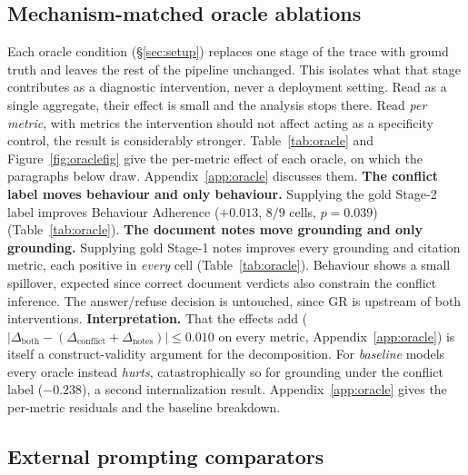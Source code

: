 \subsection{Mechanism-matched oracle ablations}
\label{sec:oracle}

Each oracle condition (\S\ref{sec:setup}) replaces one stage of the trace with ground truth
and leaves the rest of the pipeline unchanged. This isolates what that stage
contributes as a diagnostic intervention, never a deployment setting. Read as a single aggregate, their effect is small and the analysis stops there.
Read \emph{per metric}, with metrics the intervention should not affect acting
as a specificity control, the result is considerably stronger. Table~\ref{tab:oracle} and
Figure~\ref{fig:oraclefig} give the per-metric effect of each oracle, on which
the paragraphs below draw. Appendix~\ref{app:oracle} discusses them. \textbf{The conflict label moves behaviour and only behaviour.} Supplying the
gold Stage-2 label improves Behaviour Adherence ($+0.013$, $8/9$ cells,
$p=0.039$) (Table~\ref{tab:oracle}). \textbf{The document notes move grounding and only grounding.} Supplying gold
Stage-1 notes improves every grounding and citation metric, each positive in
\emph{every} cell (Table~\ref{tab:oracle}). Behaviour shows a
small spillover, expected since correct document verdicts also constrain the
conflict inference. The answer/refuse decision is untouched, since GR is
upstream of both interventions. \textbf{Interpretation.} That the effects add ($|\Delta_{\text{both}}-
(\Delta_{\text{conflict}}+\Delta_{\text{notes}})|\leq0.010$ on every metric,
Appendix~\ref{app:oracle}) is itself a
construct-validity argument for the decomposition. For \emph{baseline} models
every oracle instead \emph{hurts}, catastrophically so for grounding under the
conflict label ($-0.238$), a second internalization result.
Appendix~\ref{app:oracle} gives the per-metric residuals and the baseline
breakdown.

\subsection{External prompting comparators}
\label{sec:comparators}

